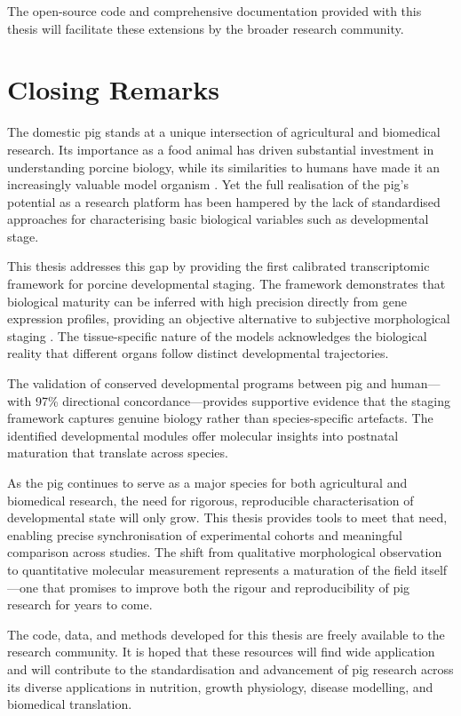 The open-source code and comprehensive documentation provided with this thesis will facilitate these extensions by the broader research community.


\section{Closing Remarks}\label{sec:conclusions:closing}

The domestic pig stands at a unique intersection of agricultural and biomedical research. Its importance as a food animal has driven substantial investment in understanding porcine biology, while its similarities to humans have made it an increasingly valuable model organism \parencite{lunney_importance_2021}. Yet the full realisation of the pig's potential as a research platform has been hampered by the lack of standardised approaches for characterising basic biological variables such as developmental stage.

This thesis addresses this gap by providing the first calibrated transcriptomic framework for porcine developmental staging. The framework demonstrates that biological maturity can be inferred with high precision directly from gene expression profiles, providing an objective alternative to subjective morphological staging \parencite{swindle_swine_2012}. The tissue-specific nature of the models acknowledges the biological reality that different organs follow distinct developmental trajectories.

The validation of conserved developmental programs between pig and human---with 97\% directional concordance---provides supportive evidence that the staging framework captures genuine biology rather than species-specific artefacts. The identified developmental modules offer molecular insights into postnatal maturation that translate across species.

As the pig continues to serve as a major species for both agricultural and biomedical research, the need for rigorous, reproducible characterisation of developmental state will only grow. This thesis provides tools to meet that need, enabling precise synchronisation of experimental cohorts and meaningful comparison across studies. The shift from qualitative morphological observation to quantitative molecular measurement represents a maturation of the field itself---one that promises to improve both the rigour and reproducibility of pig research for years to come.

The code, data, and methods developed for this thesis are freely available to the research community. It is hoped that these resources will find wide application and will contribute to the standardisation and advancement of pig research across its diverse applications in nutrition, growth physiology, disease modelling, and biomedical translation.
